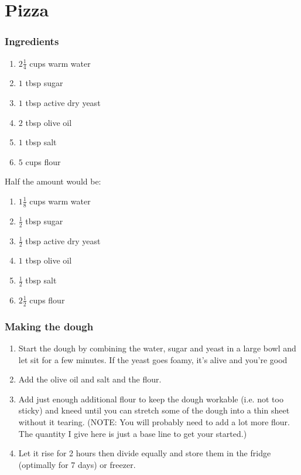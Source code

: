 \section{Pizza}
\subsubsection{Ingredients}
\begin{enumerate}
    \item $2 \frac{1}{4}$ cups warm water
    \item $1$ tbsp sugar
    \item $1$ tbsp active dry yeast
    \item $2$ tbsp olive oil
    \item $1$ tbsp salt
    \item $5$ cups flour
\end{enumerate}

Half the amount would be:
\begin{enumerate}
    \item $1 \frac{1}{8}$ cups warm water
    \item $\frac{1}{2}$ tbsp sugar
    \item $\frac{1}{2}$ tbsp active dry yeast
    \item $1$ tbsp olive oil
    \item $\frac{1}{2}$ tbsp salt
    \item $2 \frac{1}{2}$ cups flour
\end{enumerate}

\subsubsection{Making the dough}
\begin{enumerate}
    \item Start the dough by combining the water, sugar and yeast in a large bowl and let sit for a few minutes. If the yeast goes foamy, it's alive and you're good
    \item Add the olive oil and salt and the flour.
    \item Add just enough additional flour to keep the dough workable (i.e. not too sticky) and kneed until you can stretch some of the dough into a thin sheet without it tearing. (NOTE: You will probably need to add a lot more flour. The quantity I give here is just a base line to get your started.)
    \item Let it rise for 2 hours then divide equally and store them in the fridge (optimally for 7 days) or freezer.
\end{enumerate}

